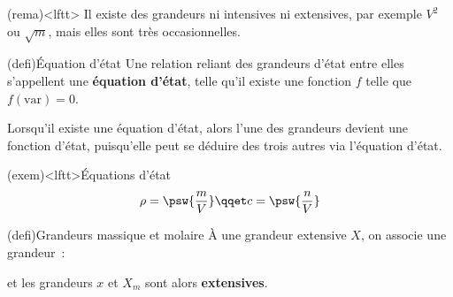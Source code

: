\documentclass[../../main/main.tex]{subfiles}
\begin{document}
\begin{tcb}(rema)<lftt>{}
	Il existe des grandeurs ni intensives ni extensives, par exemple $V^2$ ou
	$\sqrt{m}$, mais elles sont très occasionnelles.
\end{tcb}

\begin{tcb}(defi){Équation d'état}
	Une relation reliant des grandeurs d'état entre elles s'appellent une
	\textbf{équation d'état}, telle qu'il existe une fonction $f$ telle que
	$\boxed{f(\text{var}) = 0}$.
\end{tcb}

Lorsqu'il existe une équation d'état, alors l'une des grandeurs  devient une
fonction d'état, puisqu'elle peut se déduire des trois autres via l'équation
d'état.

\begin{tcb}(exem)<lftt>{Équations d'état}
	\[
		\rho = \psw{\frac{m}{V}}
		\qqet
		c = \psw{\frac{n}{V}}
	\]
\end{tcb}

\begin{tcb*}(defi){Grandeurs massique et molaire}
	À une grandeur extensive $X$, on associe une grandeur~:
	\smallbreak
	\begin{isd}
		\psw{%
			\[
				x = \frac{X}{m}
			\]
		}%
		\vspace{-15pt}
		\tcblower
		\psw{%
			\[
				X_m = \frac{X}{n}
			\]
		}%
		\vspace{-15pt}
	\end{isd}
	et les grandeurs $x$ et $X_m$ sont alors \textbf{extensives}.
\end{tcb*}
\end{document}
